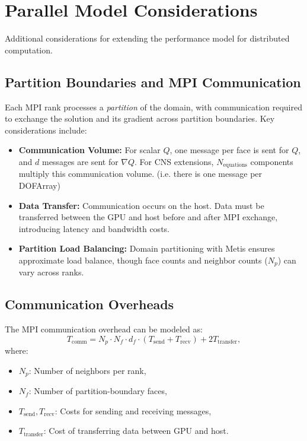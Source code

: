 \documentclass[11pt]{article}
\begin{document}
\section{Parallel Model Considerations}
\label{sec:parallel-model}

Additional considerations for extending the performance model for distributed computation.

\subsection{Partition Boundaries and MPI Communication}
Each MPI rank processes a \textit{partition} of the domain, with communication required to exchange the solution and its gradient across partition boundaries. Key considerations include:
\begin{itemize}
    \item \textbf{Communication Volume:} For scalar \( Q \), one message per face is sent for \( Q \), and \( d \) messages are sent for \( \nabla Q \). For CNS extensions, \( N_{\text{equations}} \) components multiply this communication volume. (i.e. there is one message per \ceesdcode{} DOFArray)
    \item \textbf{Data Transfer:} Communication occurs on the host. Data must be transferred between the GPU and host before and after MPI exchange, introducing latency and bandwidth costs.
    \item \textbf{Partition Load Balancing:} Domain partitioning with Metis ensures approximate load balance, though face counts and neighbor counts (\( N_p \)) can vary across ranks.
\end{itemize}

\subsection{Communication Overheads}
The MPI communication overhead can be modeled as:
\[
T_{\text{comm}} = N_p \cdot N_f \cdot d_f \cdot \left( T_{\text{send}} + T_{\text{recv}} \right) + 2T_{\text{transfer}},
\]
where:
\begin{itemize}
    \item \( N_p \): Number of neighbors per rank,
    \item \( N_f \): Number of partition-boundary faces,
    \item \( T_{\text{send}}, T_{\text{recv}} \): Costs for sending and receiving messages,
    \item \( T_{\text{transfer}} \): Cost of transferring data between GPU and host.
\end{itemize}
\end{document}
